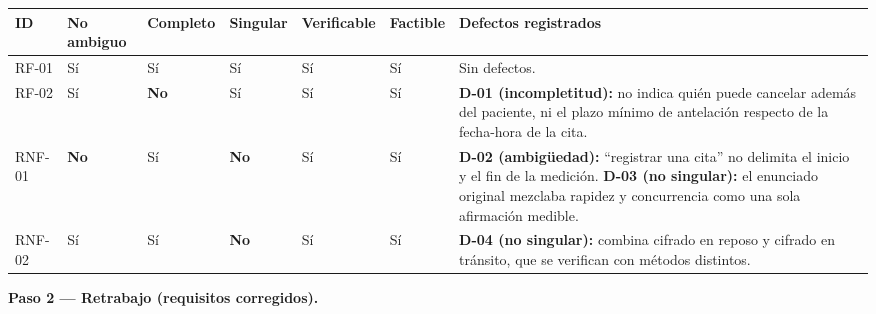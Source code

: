 \documentclass[11pt,a4paper,oneside]{article}
\begin{document}
	{\footnotesize
		\begin{center}
			\begin{tabularx}{\textwidth}{|C{1.2cm}|C{1.5cm}|C{1.4cm}|C{1.3cm}|C{1.5cm}|C{1.3cm}|Y|}
				\hline
				\textbf{ID} & \textbf{No ambiguo} & \textbf{Completo} & \textbf{Singular} & \textbf{Verificable} & \textbf{Factible} & \textbf{Defectos registrados} \\ \hline
				RF-01 & Sí & Sí & Sí & Sí & Sí & Sin defectos. \\ \hline
				RF-02 & Sí & \textbf{No} & Sí & Sí & Sí & \textbf{D-01 (incompletitud):} no indica quién puede cancelar además del paciente, ni el plazo mínimo de antelación respecto de la fecha-hora de la cita. \\ \hline
				RNF-01 & \textbf{No} & Sí & \textbf{No} & Sí & Sí & \textbf{D-02 (ambigüedad):} ``registrar una cita'' no delimita el inicio y el fin de la medición. \newline \textbf{D-03 (no singular):} el enunciado original mezclaba rapidez y concurrencia como una sola afirmación medible. \\ \hline
				RNF-02 & Sí & Sí & \textbf{No} & Sí & Sí & \textbf{D-04 (no singular):} combina cifrado en reposo y cifrado en tránsito, que se verifican con métodos distintos. \\ \hline
			\end{tabularx}
	\end{center}}
	
	\vspace{4pt}
	\noindent\textbf{Paso 2 — Retrabajo (requisitos corregidos).}
	
\end{document}
